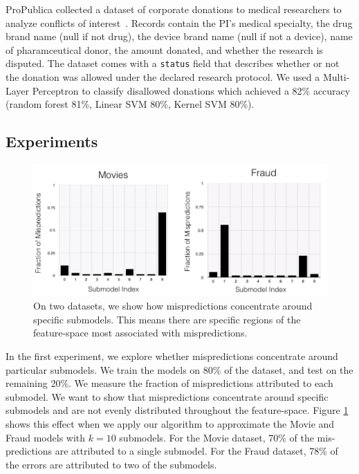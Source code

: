  ProPublica collected a dataset of corporate donations to medical researchers to analyze conflicts of interest~\cite{dollarsfordocs}. 
Records contain the PI's medical specialty, the drug brand name (null if not drug), the device brand name (null if not a device), name of pharamceutical donor, the amount donated, and whether the research is disputed.
The dataset comes with a \texttt{status} field that describes whether or not the donation was allowed under the declared research protocol.
We used a Multi-Layer Perceptron to classify disallowed donations which achieved a 82\% accuracy (random forest 81\%, Linear SVM 80\%, Kernel SVM 80\%).

\subsection{Experiments}

\begin{figure}[ht]
    \centering
    \includegraphics[width=\columnwidth]{figures/concentration.png}
    \caption{On two datasets, we show how mispredictions concentrate around specific submodels. This means there are specific regions of the feature-space most associated with mispredictions.}
    \label{fig:concentrate}
\end{figure}

In the first experiment, we explore whether mispredictions concentrate around particular submodels. We train the models on 80\% of the dataset, and test on the remaining 20\%. We measure the fraction of mispredictions attributed to each submodel. We want to show that mispredictions concentrate around specific submodels and are not evenly distributed throughout the feature-space. Figure \ref{fig:concentrate} shows this effect when we apply our algorithm to approximate the Movie and Fraud models with $k=10$ submodels. For the Movie dataset, 70\% of the mis-predictions are attributed to a single submodel.
For the Fraud dataset, 78\% of the errors are attributed to two of the submodels.

